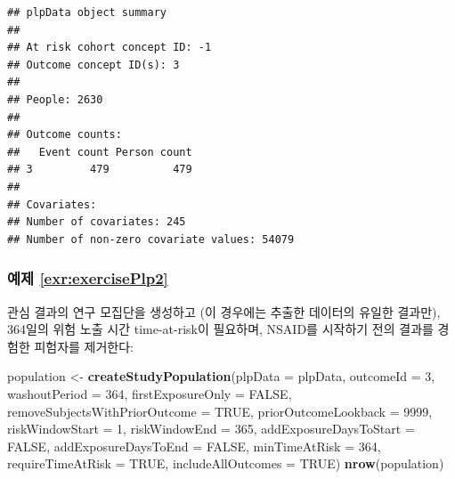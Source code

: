 \documentclass[10.5pt]{book}
\newenvironment{Shaded}{\begin{snugshade}}{\end{snugshade}}
\newcommand{\KeywordTok}[1]{\textcolor[rgb]{0.13,0.29,0.53}{\textbf{#1}}}
\newcommand{\DataTypeTok}[1]{\textcolor[rgb]{0.13,0.29,0.53}{#1}}
\newcommand{\DecValTok}[1]{\textcolor[rgb]{0.00,0.00,0.81}{#1}}
\newcommand{\StringTok}[1]{\textcolor[rgb]{0.31,0.60,0.02}{#1}}
\newcommand{\OtherTok}[1]{\textcolor[rgb]{0.56,0.35,0.01}{#1}}
\newcommand{\NormalTok}[1]{#1}
\theoremstyle{definition}
\theoremstyle{definition}
\theoremstyle{definition}
\theoremstyle{remark}
\begin{document}
\begin{verbatim}
## plpData object summary
## 
## At risk cohort concept ID: -1
## Outcome concept ID(s): 3
## 
## People: 2630
## 
## Outcome counts:
##   Event count Person count
## 3         479          479
## 
## Covariates:
## Number of covariates: 245
## Number of non-zero covariate values: 54079
\end{verbatim}

\subsubsection*{예제 \ref{exr:exercisePlp2}}\label{-refexrexerciseplp2}

관심 결과의 연구 모집단을 생성하고 (이 경우에는 추출한 데이터의 유일한
결과만), 364일의 위험 노출 시간 time-at-risk이 필요하며, NSAID를
시작하기 전의 결과를 경험한 피험자를 제거한다:

\begin{Shaded}
\begin{Highlighting}[]
\NormalTok{population <-}\StringTok{ }\KeywordTok{createStudyPopulation}\NormalTok{(}\DataTypeTok{plpData =}\NormalTok{ plpData,}
                                    \DataTypeTok{outcomeId =} \DecValTok{3}\NormalTok{,}
                                    \DataTypeTok{washoutPeriod =} \DecValTok{364}\NormalTok{,}
                                    \DataTypeTok{firstExposureOnly =} \OtherTok{FALSE}\NormalTok{,}
                                    \DataTypeTok{removeSubjectsWithPriorOutcome =} \OtherTok{TRUE}\NormalTok{,}
                                    \DataTypeTok{priorOutcomeLookback =} \DecValTok{9999}\NormalTok{,}
                                    \DataTypeTok{riskWindowStart =} \DecValTok{1}\NormalTok{,}
                                    \DataTypeTok{riskWindowEnd =} \DecValTok{365}\NormalTok{,}
                                    \DataTypeTok{addExposureDaysToStart =} \OtherTok{FALSE}\NormalTok{,}
                                    \DataTypeTok{addExposureDaysToEnd =} \OtherTok{FALSE}\NormalTok{,}
                                    \DataTypeTok{minTimeAtRisk =} \DecValTok{364}\NormalTok{,}
                                    \DataTypeTok{requireTimeAtRisk =} \OtherTok{TRUE}\NormalTok{,}
                                    \DataTypeTok{includeAllOutcomes =} \OtherTok{TRUE}\NormalTok{)}
\KeywordTok{nrow}\NormalTok{(population)}
\end{Highlighting}
\end{Shaded}
\end{document}

